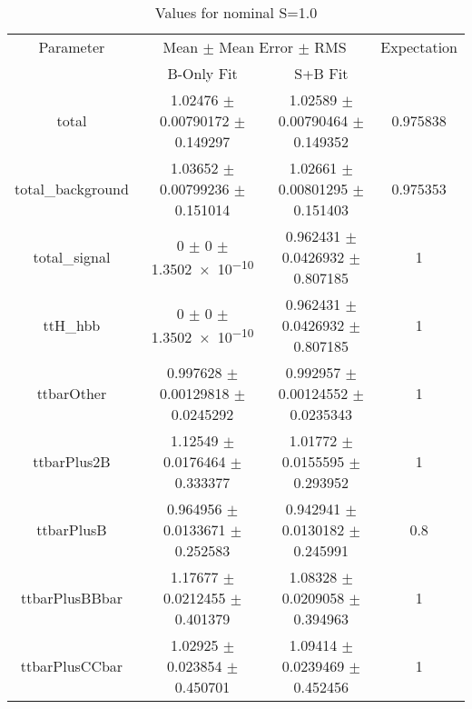 \begin{table}
\centering
\caption{Values for nominal S=1.0}
\begin{tabular}{cccc}
\toprule
Parameter & \multicolumn{2}{c}{Mean $\pm$ Mean Error $\pm$ RMS} & Expectation\\
 & B-Only Fit & S+B Fit & \\
\midrule
total & \num{1.02476} $\pm$ \num{0.00790172} $\pm$ \num{0.149297} & \num{1.02589} $\pm$ \num{0.00790464} $\pm$ \num{0.149352} & \num{0.975838}\\
total\_background & \num{1.03652} $\pm$ \num{0.00799236} $\pm$ \num{0.151014} & \num{1.02661} $\pm$ \num{0.00801295} $\pm$ \num{0.151403} & \num{0.975353}\\
total\_signal & \num{0} $\pm$ \num{0} $\pm$ \num{1.3502e-10} & \num{0.962431} $\pm$ \num{0.0426932} $\pm$ \num{0.807185} & \num{1}\\
ttH\_hbb & \num{0} $\pm$ \num{0} $\pm$ \num{1.3502e-10} & \num{0.962431} $\pm$ \num{0.0426932} $\pm$ \num{0.807185} & \num{1}\\
ttbarOther & \num{0.997628} $\pm$ \num{0.00129818} $\pm$ \num{0.0245292} & \num{0.992957} $\pm$ \num{0.00124552} $\pm$ \num{0.0235343} & \num{1}\\
ttbarPlus2B & \num{1.12549} $\pm$ \num{0.0176464} $\pm$ \num{0.333377} & \num{1.01772} $\pm$ \num{0.0155595} $\pm$ \num{0.293952} & \num{1}\\
ttbarPlusB & \num{0.964956} $\pm$ \num{0.0133671} $\pm$ \num{0.252583} & \num{0.942941} $\pm$ \num{0.0130182} $\pm$ \num{0.245991} & \num{0.8}\\
ttbarPlusBBbar & \num{1.17677} $\pm$ \num{0.0212455} $\pm$ \num{0.401379} & \num{1.08328} $\pm$ \num{0.0209058} $\pm$ \num{0.394963} & \num{1}\\
ttbarPlusCCbar & \num{1.02925} $\pm$ \num{0.023854} $\pm$ \num{0.450701} & \num{1.09414} $\pm$ \num{0.0239469} $\pm$ \num{0.452456} & \num{1}\\
\bottomrule
\end{tabular}
\end{table}